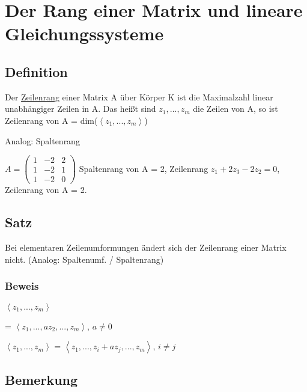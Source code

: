 \documentclass[a4paper, openany]{book}
\begin{document}
        \chapter{Der Rang einer Matrix und lineare Gleichungssysteme}

        \section{Definition}

        Der \underline{Zeilenrang} einer Matrix A über Körper K ist die Maximalzahl linear unabhängiger Zeilen in A. Das heißt sind $z_1, ..., z_m$ die Zeilen von A, so ist Zeilenrang von A = dim($\left \langle z_1, ..., z_m \right \rangle$)

        \par \medskip

        Analog: Spaltenrang

        \par \medskip

        $A = \begin{pmatrix}1 & -2 & 2 \\ 1 & -2 & 1 \\ 1 & -2 & 0 \end{pmatrix}$ Spaltenrang von A = 2, Zeilenrang $z_1 + 2z_3 - 2z_2 = 0$, Zeilenrang von A = 2.

        \section{Satz}

        Bei elementaren Zeilenumformungen ändert sich der Zeilenrang einer Matrix nicht. (Analog: Spaltenumf. / Spaltenrang)

        \subsection{Beweis}

        $\left \langle z_1, ..., z_m \right \rangle$

        = $\left \langle z_1, ..., az_2, ..., z_m \right \rangle$, $a \neq 0$

        \par \medskip

        $\left \langle z_1, ..., z_m \right \rangle$ = $\left \langle z_1, ..., z_i + az_j, ..., z_m \right \rangle$, $i \neq j$

        \section{Bemerkung}
\end{document}
